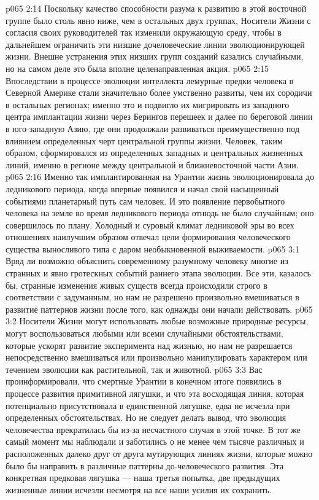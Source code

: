 \vs p065 2:14 Поскольку качество способности разума к развитию в этой восточной группе было столь явно ниже, чем в остальных двух группах, Носители Жизни с согласия своих руководителей так изменили окружающую среду, чтобы в дальнейшем ограничить эти низшие дочеловеческие линии эволюционирующей жизни. Внешне устранения этих низших групп созданий казались случайными, но на самом деле это была вполне целенаправленная акция.
\vs p065 2:15 Впоследствии в процессе эволюции интеллекта лемурные предки человека в Северной Америке стали значительно более умственно развиты, чем их сородичи в остальных регионах; именно это и подвигло их мигрировать из западного центра имплантации жизни через Берингов перешеек и далее по береговой линии в юго\hyp{}западную Азию, где они продолжали развиваться преимущественно под влиянием определенных черт центральной группы жизни. Человек, таким образом, сформировался из определенных западных и центральных жизненных линий, именно в регионе между центральной и ближневосточной части Азии.
\vs p065 2:16 Именно так имплантированная на Урантии жизнь эволюционировала до ледникового периода, когда впервые появился и начал свой насыщенный событиями планетарный путь сам человек. И это появление первобытного человека на земле во время ледникового периода отнюдь не было случайным; оно совершилось по плану. Холодный и суровый климат ледниковой эры во всех отношениях наилучшим образом отвечал цели формирования человеческого существа выносливого типа с даром необыкновенной выживаемости.
\vs p065 3:1 Вряд ли возможно объяснить современному разумному человеку многие из странных и явно гротескных событий раннего этапа эволюции. Все эти, казалось бы, странные изменения живых существ всегда происходили строго в соответствии с задуманным, но нам не разрешено произвольно вмешиваться в развитие паттернов жизни после того, как однажды они начали действовать.
\vs p065 3:2 \pc Носители Жизни могут использовать любые возможные природные ресурсы, могут воспользоваться любыми или всеми случайными обстоятельствами, которые ускорят развитие эксперимента над жизнью, но нам не разрешается непосредственно вмешиваться или произвольно манипулировать характером или течением эволюции как растительной, так и животной.
\vs p065 3:3 Вас проинформировали, что смертные Урантии в конечном итоге появились в процессе развития примитивной лягушки, и что эта восходящая линия, которая потенциально присутствовала в единственной лягушке, едва не исчезла при определенных обстоятельствах. Но не следует делать вывод, что эволюция человечества прекратилась бы из\hyp{}за несчастного случая в этой точке. В тот же самый момент мы наблюдали и заботились о не менее чем тысяче различных и расположенных далеко друг от друга мутирующих линиях жизни, которые можно было бы направить в различные паттерны до\hyp{}человеческого развития. Эта конкретная предковая лягушка --- наша третья попытка, две предыдущих жизненные линии исчезли несмотря на все наши усилия их сохранить.
